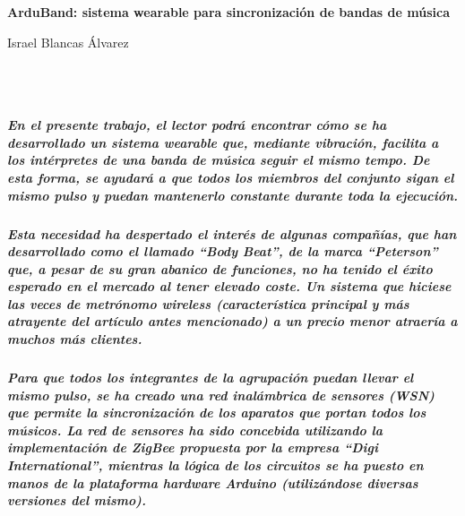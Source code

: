 \chapter*{}





\cleardoublepage
\thispagestyle{empty}

\begin{center}
{\large\bfseries ArduBand: sistema wearable para sincronización de bandas de música}\\
\end{center}
\begin{center}
Israel Blancas Álvarez\\
\end{center}

\\

\vspace{0.7cm}
\\
\paragraph{
  En el presente trabajo, el lector podrá encontrar cómo se ha desarrollado un sistema wearable que, mediante vibración, facilita a los intérpretes de una banda de música seguir el mismo tempo. De esta forma, se ayudará a que todos los miembros del conjunto sigan el mismo pulso y puedan mantenerlo constante durante toda la ejecución.
}
\paragraph{
  Esta necesidad ha despertado el interés de algunas compañías, que han desarrollado como el llamado “Body Beat”, de la marca “Peterson” que, a pesar de su gran abanico de funciones, no ha tenido el éxito esperado en el mercado al tener elevado coste. Un sistema que hiciese las veces de metrónomo wireless (característica principal y más atrayente del artículo antes mencionado) a un precio menor atraería a muchos más clientes.
}
\paragraph{
Para que todos los integrantes de la agrupación puedan llevar el mismo pulso, se ha creado una red inalámbrica de sensores (WSN) que permite la sincronización de los aparatos que portan todos los músicos. La red de sensores ha sido concebida utilizando la implementación de ZigBee propuesta por la empresa “Digi International”, mientras la lógica de los circuitos se ha puesto en manos de la plataforma hardware Arduino (utilizándose diversas versiones del mismo).
}
